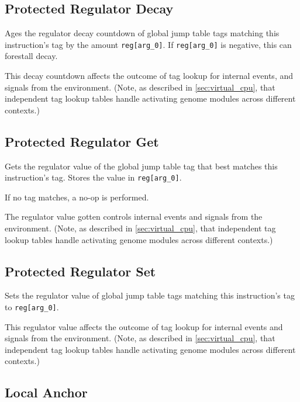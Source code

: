 \subsection{Protected Regulator Decay}


Ages the regulator decay countdown of global jump table tags matching this instruction's tag by the amount \texttt{reg[arg\_0]}.
If \texttt{reg[arg\_0]} is negative, this can forestall decay. 

This decay countdown affects the outcome of tag lookup for internal events, and signals from the environment.
(Note, as described in \ref{sec:virtual_cpu}, that independent tag lookup tables handle activating genome modules across different contexts.)

\subsection{Protected Regulator Get}


Gets the regulator value of the global jump table tag that best matches this instruction's tag.
Stores the value in \texttt{reg[arg\_0]}.

If no tag matches, a no-op is performed.

The regulator value gotten controls internal events and signals from the environment.
(Note, as described in \ref{sec:virtual_cpu}, that independent tag lookup tables handle activating genome modules across different contexts.)

\subsection{Protected Regulator Set}


Sets the regulator value of global jump table tags matching this instruction's tag to \texttt{reg[arg\_0]}.

This regulator value affects the outcome of tag lookup for internal events and signals from the environment.
(Note, as described in \ref{sec:virtual_cpu}, that independent tag lookup tables handle activating genome modules across different contexts.)

\subsection{Local Anchor}

